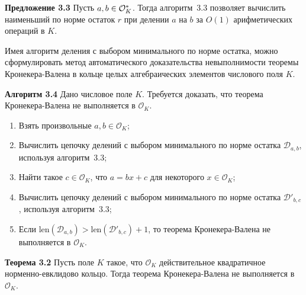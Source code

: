 \documentclass[_00_autoref.tex]{subfiles}
\begin{document}
\textbf{Предложение 3.3}
    Пусть $a, b \in \mathcal{O}_K^{*}$.
    Тогда алгоритм~$3.3$ позволяет вычислить наименьший по норме остаток $r$ при делении $a$ на $b$ за $O(1)$ арифметических операций в $K$.


Имея алгоритм деления с выбором минимального по норме остатка, можно сформулировать метод автоматического доказательства невыполнимости теоремы Кронекера-Валена в кольце целых алгебраических элементов числового поля $K$.

\textbf{Алгоритм 3.4}\label{algorithm:kronecker_vahlen_common}
    Дано числовое поле $K$.
    Требуется доказать, что теорема Кронекера-Валена не выполняется в $\mathcal{O}_K$.
    
    \begin{enumerate}
        \item Взять произвольные $a, b \in \mathcal{O}_K$;

        \item Вычислить цепочку делений с выбором минимального по норме остатка $\mathcal{D}_{a, b}$, используя алгоритм~3.3;

        \item Найти такое $c \in \mathcal{O}_K$, что $a = bx + c$ для некоторого $x \in \mathcal{O}_K$;

        \item Вычислить цепочку делений с выбором минимального по норме остатка $\mathcal{D}'_{b,c}$, используя алгоритм~3.3;

        \item Если $\textrm{len}(\mathcal{D}_{a, b}) > \textrm{len}(\mathcal{D}'_{b, c}) + 1$, то теорема Кронекера-Валена не выполняется в $\mathcal{O}_K$.
    \end{enumerate}


\textbf{Теорема 3.2}\label{theorem:kronecker}
    Пусть поле $K$ такое, что $\mathcal{O}_K$ действительное квадратичное норменно-евклидово кольцо.
    Тогда теорема Кронекера-Валена не выполняется в $\mathcal{O}_K$.
\end{document}
